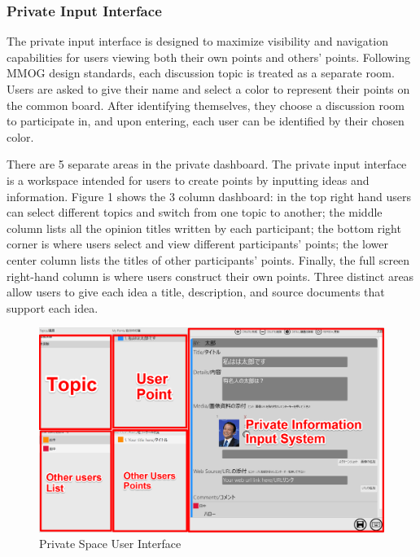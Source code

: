 \documentclass{sigchi}
\begin{document}
\subsubsection{Private Input Interface}

The private input interface is designed to maximize visibility and navigation capabilities for users viewing both their own points and others' points. Following MMOG design standards, each discussion topic is treated as a separate room. Users are asked to give their name and select a color to represent their points on the common board. After identifying themselves, they choose a discussion room to participate in, and upon entering, each user can be identified by their chosen color.  


There are 5 separate areas in the private dashboard. The private input interface is a workspace intended for users to create points by inputting ideas and information. Figure 1 shows the 3 column dashboard: in the top right hand users can select different topics and switch from one topic to another; the middle column lists all the opinion titles written by each participant; the bottom right corner is where users select and view different participants' points; the lower center column lists the titles of other participants' points. Finally, the full screen right-hand column is where users construct their own points. Three distinct areas allow users to give each idea a title, description, and source documents that support each idea. 

\begin{figure}
\centering
\includegraphics[width=1.0\columnwidth]{private}
\caption{Private Space User Interface}
\label{fig:figure1}
\end{figure}
\end{document}
